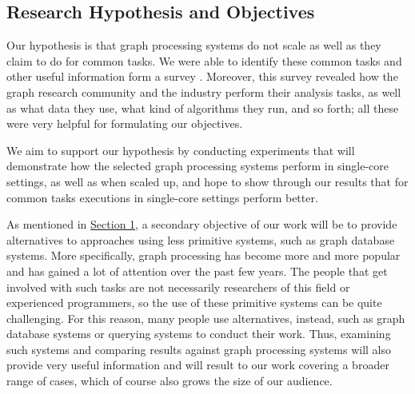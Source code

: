 \documentclass[a4paper,11pt]{article}
\begin{document}
\subsection{Research Hypothesis and Objectives} \label{hypothesis}

\par Our hypothesis is that graph processing systems do not scale as well as they claim to do for common tasks. We were able to identify these common tasks and other useful information form a survey \cite{survey}. Moreover, this survey revealed how the graph research community and the industry perform their analysis tasks, as well as what data they use, what kind of algorithms they run, and so forth; all these were very helpful for formulating our objectives.

\medskip

\par We aim to support our hypothesis by conducting experiments that will demonstrate how the selected graph processing systems perform in single-core settings, as well as when scaled up, and hope to show through our results that for common tasks executions in single-core settings perform better.

\medskip

\par As mentioned in \hyperref[introduction]{Section 1}, a secondary objective of our work will be to provide alternatives to approaches using less primitive systems, such as graph database systems. More specifically, graph processing has become more and more popular and has gained a lot of attention over the past few years. The people that get involved with such tasks are not necessarily researchers of this field or experienced programmers, so the use of these primitive systems can be quite challenging. For this reason, many people use alternatives, instead, such as graph database systems or querying systems to conduct their work. Thus, examining such systems and comparing results against graph processing systems will also provide very useful information and will result to our work covering a broader range of cases, which of course also grows the size of our audience.


\end{document}
